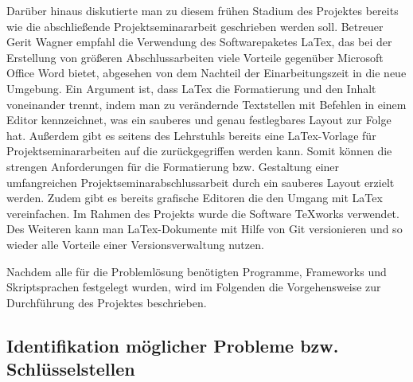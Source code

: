 {Darüber hinaus diskutierte man zu diesem frühen Stadium des Projektes bereits wie die abschließende Projektseminararbeit geschrieben werden soll. Betreuer Gerit Wagner empfahl die Verwendung des Softwarepaketes LaTex, das bei der Erstellung von größeren Abschlussarbeiten viele Vorteile gegenüber Microsoft Office Word bietet, abgesehen von dem Nachteil der Einarbeitungszeit in die neue Umgebung. Ein Argument ist, dass LaTex die Formatierung und den Inhalt voneinander trennt, indem man zu verändernde Textstellen mit Befehlen in einem Editor kennzeichnet, was ein sauberes und genau festlegbares Layout zur Folge hat.  Außerdem gibt es seitens des Lehrstuhls bereits eine LaTex-Vorlage für Projektseminararbeiten auf die zurückgegriffen werden kann. Somit können die strengen Anforderungen für die Formatierung bzw. Gestaltung einer umfangreichen Projektseminarabschlussarbeit durch ein sauberes Layout erzielt werden. Zudem gibt es bereits grafische Editoren die den Umgang mit LaTex vereinfachen. Im Rahmen des Projekts wurde die Software TeXworks verwendet. Des Weiteren kann man LaTex-Dokumente mit Hilfe von Git versionieren und so wieder alle Vorteile einer Versionsverwaltung nutzen.

Nachdem alle für die Problemlösung benötigten Programme, Frameworks und Skriptsprachen festgelegt wurden, wird im Folgenden die Vorgehensweise zur Durchführung des Projektes beschrieben.

\subsection{Identifikation möglicher Probleme bzw. Schlüsselstellen}

}
